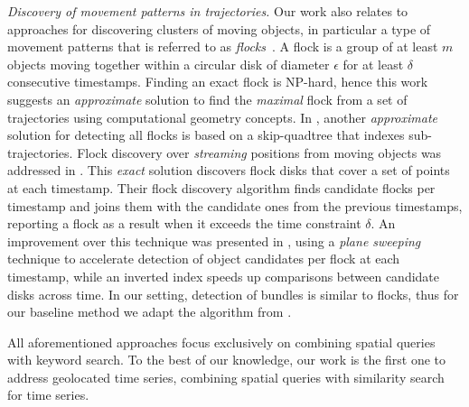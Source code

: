 {{\noindent \emph{Discovery of movement patterns in trajectories.} Our work also relates to approaches for discovering clusters of moving objects, in particular a type of movement patterns that is referred to as {\em flocks}~\cite{gudmundsson2006computing}. A flock is a group of at least $m$ objects moving together within a circular disk of diameter $\epsilon$ for at least $\delta$ consecutive timestamps. Finding an exact flock is NP-hard, hence this work suggests an \textit{approximate} solution to find the \textit{maximal} flock from a set of trajectories using computational geometry concepts. In \cite{benkert2008reporting}, another \textit{approximate} solution for detecting all flocks is based on a skip-quadtree that indexes sub-trajectories. Flock discovery over {\em streaming} positions from moving objects was addressed in \cite{vieira2009line}. This \textit{exact} solution discovers flock disks that cover a set of points at each timestamp. Their flock discovery algorithm finds candidate flocks per timestamp and joins them with the candidate ones from the previous timestamps, reporting a flock as a result when it exceeds the time constraint $\delta$. An improvement over this technique was presented in \cite{tanaka2015efficient}, using a \textit{plane sweeping} technique to accelerate detection of object candidates per flock at each timestamp, while an inverted index speeds up comparisons between candidate disks across time. In our setting, detection of bundles is similar to flocks, thus for our baseline method we adapt the algorithm from \cite{vieira2009line}.

All aforementioned approaches focus exclusively on combining spatial queries with keyword search. To the best of our knowledge, our work is the first one to address geolocated time series, combining spatial queries with similarity search for time series.}

}
